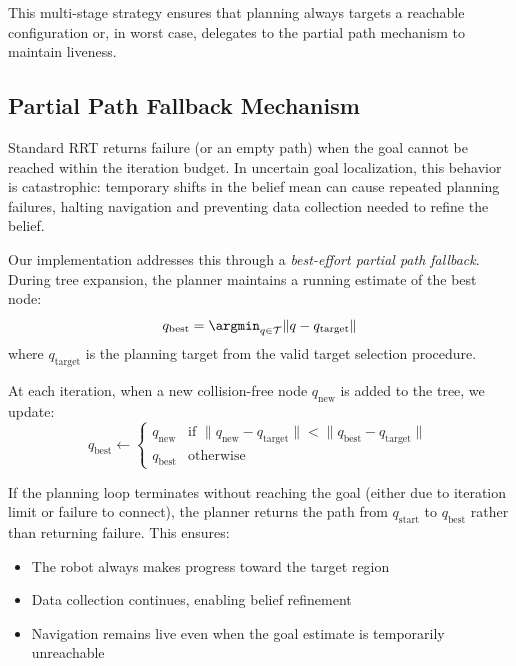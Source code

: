 This multi-stage strategy ensures that planning always targets a reachable configuration or, in worst case, delegates to the partial path mechanism to maintain liveness.

\subsection{Partial Path Fallback Mechanism}

Standard RRT returns failure (or an empty path) when the goal cannot be reached within the iteration budget. In uncertain goal localization, this behavior is catastrophic: temporary shifts in the belief mean can cause repeated planning failures, halting navigation and preventing data collection needed to refine the belief.

Our implementation addresses this through a \emph{best-effort partial path fallback}. During tree expansion, the planner maintains a running estimate of the best node:
\begin{equation}
    q_{\text{best}} = \argmin_{q \in \mathcal{T}} \|q - q_{\text{target}}\|
\end{equation}
where $q_{\text{target}}$ is the planning target from the valid target selection procedure.

At each iteration, when a new collision-free node $q_{\text{new}}$ is added to the tree, we update:
\begin{equation}
    q_{\text{best}} \leftarrow \begin{cases}
        q_{\text{new}} & \text{if } \|q_{\text{new}} - q_{\text{target}}\| < \|q_{\text{best}} - q_{\text{target}}\| \\
        q_{\text{best}} & \text{otherwise}
    \end{cases}
\end{equation}

If the planning loop terminates without reaching the goal (either due to iteration limit or failure to connect), the planner returns the path from $q_{\text{start}}$ to $q_{\text{best}}$ rather than returning failure. This ensures:
\begin{itemize}
    \item The robot always makes progress toward the target region
    \item Data collection continues, enabling belief refinement
    \item Navigation remains live even when the goal estimate is temporarily unreachable
\end{itemize}

